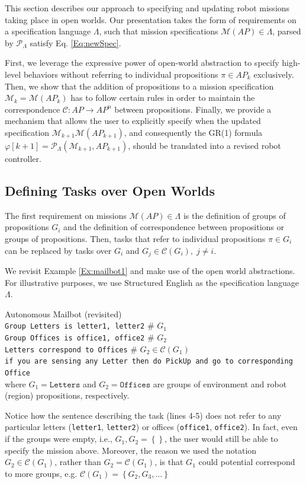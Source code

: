 This section describes our approach to specifying and updating robot missions taking place in open worlds. 
Our presentation takes the form of requirements on a specification language $\Lambda$, such that mission specifications $\mathcal{M}(AP) \in \Lambda$, parsed by $\mathcal{P}_{\Lambda}$ satisfy Eq. \eqref{Eq:newSpec}. 

First, we leverage the expressive power of open-world abstraction to specify high-level behaviors without referring to individual propositions $\pi \in AP_k$ exclusively. 
Then, we show that the addition of propositions to a mission specification $\mathcal{M}_k = \mathcal{M}(AP_k)$ has to follow certain rules in order to maintain the correspondence $\mathcal{C}: AP \rightarrow AP^{n}$ between propositions. Finally, we provide a mechanism that allows the user to explicitly specify when the updated specification $\mathcal{M}_{k+1} \mathcal{M}(AP_{k+1})$, and consequently the GR(1) formula $\varphi [k+1] = \mathcal{P}_{\Lambda} (\mathcal{M}_{k+1}, AP_{k+1})$, should be translated into a revised robot controller.

\subsection{Defining Tasks over Open Worlds}

The first requirement on missions $\mathcal{M}(AP) \in \Lambda$ is the definition of groups of propositions $G_i$ and the definition of correspondence between propositions or groups of propositions. Then, tasks that refer to individual propositions $\pi \in G_i$ can be replaced by tasks over $G_i$ and $G_j \in \mathcal{C}(G_i), \; j \not = i$.

We revisit Example \ref{Ex:mailbot1} and make use of the open world abstractions. For illustrative purposes, we use Structured English \cite{JFRKGICRA12} as the specification language $\Lambda$.

\begin{myExample}\label{Ex:mailbot2} Autonomous Mailbot (revisited)\\
\texttt{Group Letters is letter1, letter2} \# $G_1$ \\
\texttt{Group Offices is office1, office2} \# $G_2$ \\
\texttt{Letters correspond to Offices} \# $G_2 \in \mathcal{C}(G_1)$\\
\texttt{if you are sensing any Letter then do PickUp and go to corresponding Office}\\ 
where $G_1 = \texttt{Letters}$ and $G_2 = \texttt{Offices}$ are groups of environment and robot (region) propositions, respectively.
\end{myExample}
Notice how the sentence describing the task (lines 4-5) does not refer to any particular letters (\texttt{letter1}, \texttt{letter2}) or offices (\texttt{office1}, \texttt{office2}). 
In fact, even if the groups were empty, i.e., $G_1, G_2 = \left\{ \right\}$, the user would still be able to specify the mission above.
Moreover, the reason we used the notation $G_2 \in \mathcal{C}(G_1)$, rather than $G_2 = \mathcal{C}(G_1)$, is that $G_1$ could potential correspond to more groups, e.g. $\mathcal{C}(G_1) = \left\{ G_2, G_3, \ldots\right\}$

